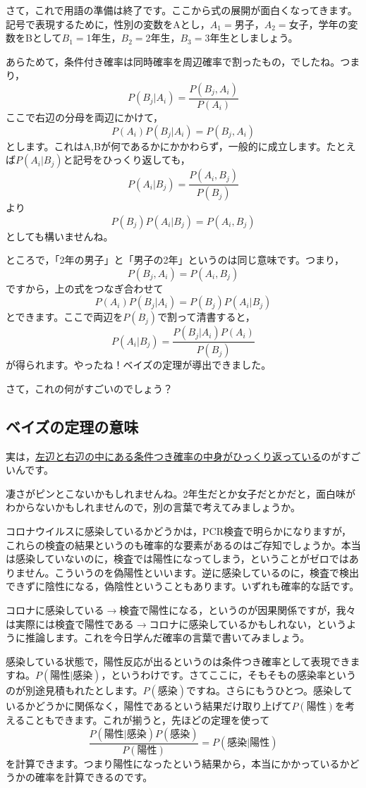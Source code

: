 \documentclass{ltjsarticle}
\begin{document}
さて，これで用語の準備は終了です。ここから式の展開が面白くなってきます。記号で表現するために，性別の変数をAとし，$A_1=$男子，$A_2=$女子，学年の変数をBとして$B_1=$1年生，$B_2=$2年生，$B_3=$3年生としましょう。

あらためて，条件付き確率は同時確率を周辺確率で割ったもの，でしたね。つまり，
\[ P(B_j | A_i) = \frac{P(B_j,A_i)}{P(A_i)} \]
ここで右辺の分母を両辺にかけて，
\[ P(A_i)P(B_j|A_i) = P(B_j,A_i) \]
とします。これはA,Bが何であるかにかかわらず，一般的に成立します。たとえば$P(A_i|B_j)$と記号をひっくり返しても，
\[ P(A_i|B_j) = \frac{P(A_i,B_j)}{P(B_j)} \]
より
\[P(B_j)P(A_i|B_j) = P(A_i,B_j) \]
としても構いませんね。


ところで，「2年の男子」と「男子の2年」というのは同じ意味です。つまり，
\[P(B_j,A_i) = P(A_i, B_j) \]
ですから，上の式をつなぎ合わせて
\[P(A_i)P(B_j|A_i) = P(B_j)P(A_i|B_j) \]
とできます。ここで両辺を$P(B_j)$で割って清書すると，
\[ P(A_i | B_j )=\frac{P(B_j|A_i)P(A_i)}{P(B_j)} \]
が得られます。やったね！ベイズの定理が導出できました。


さて，これの何がすごいのでしょう？ 
\subsection{ベイズの定理の意味}
実は，\underline{左辺と右辺の中にある条件つき確率の中身がひっくり返っている}のがすごいんです。

凄さがピンとこないかもしれませんね。2年生だとか女子だとかだと，面白味がわからないかもしれませんので，別の言葉で考えてみましょうか。

コロナウイルスに感染しているかどうかは，PCR検査で明らかになりますが，これらの検査の結果というのも確率的な要素があるのはご存知でしょうか。本当は感染していないのに，検査では陽性になってしまう，ということがゼロではありません。こういうのを偽陽性といいます。逆に感染しているのに，検査で検出できずに陰性になる，偽陰性ということもあります。いずれも確率的な話です。

コロナに感染している$\to$検査で陽性になる，というのが因果関係ですが，我々は実際には検査で陽性である$\to$コロナに感染しているかもしれない，というように推論します。これを今日学んだ確率の言葉で書いてみましょう。

感染している状態で，陽性反応が出るというのは条件つき確率として表現できますね。$P(\mbox{陽性}|\mbox{感染})$，というわけです。さてここに，そもそもの感染率というのが別途見積もれたとします。$P(\mbox{感染})$ですね。さらにもうひとつ。感染しているかどうかに関係なく，陽性であるという結果だけ取り上げて$P(\mbox{陽性})$を考えることもできます。これが揃うと，先ほどの定理を使って
\[ \frac{P(\mbox{陽性}|\mbox{感染})P(\mbox{感染})}{P(\mbox{陽性})} = P(\mbox{感染}|\mbox{陽性})\]
を計算できます。つまり陽性になったという結果から，本当にかかっているかどうかの確率を計算できるのです。
\end{document}
